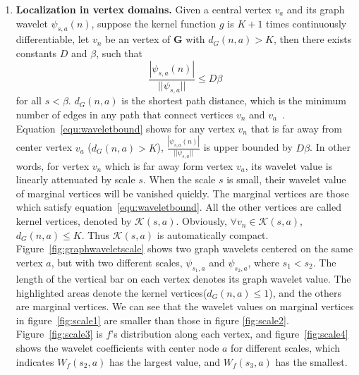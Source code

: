 \documentclass[conference]{IEEEtran}
\begin{document}
\begin{enumerate}
\item \textbf{Localization in vertex domains.} Given a central vertex $v_a$ and its graph wavelet $\psi_{s,a}(n)$, suppose the kernel function $g$ is $K+1$ times continuously differentiable, let $v_n$ be an vertex of $\mathbf{G}$ with $d_G(n,a)>K$, then there exists constants $D$ and $\beta$, such that
\begin{equation}
\label{equ:waveletbound}
\frac{|\psi_{s,a}(n)|}{||\psi_{s,a}||}\leq D \beta
\end{equation} for all $s<\beta$.
$d_G(n,a)$ is the shortest path distance, which is the minimum number of edges in any path that connect vertices $v_n$ and $v_a$~\cite{hammond2011wavelets}. Equation~\ref{equ:waveletbound} shows for any vertex $v_n$ that is far away from center vertex $v_a$ ($d_G(n,a)>K$), $\frac{|\psi_{s,a}(n)|}{||\psi_{s,a}||}$ is upper bounded by $D\beta$. In other words, for vertex $v_n$ which is far away form vertex $v_a$, its wavelet value is linearly attenuated by scale $s$.  When the scale $s$ is small, their wavelet value of marginal vertices will be vanished quickly. The marginal vertices are those which satisfy equation~\ref{equ:waveletbound}. All the other vertices are called kernel vertices, denoted by $\mathcal{K}(s,a)$. Obviously,   $\forall v_n \in \mathcal{K}(s,a)$,  $d_G(n,a)\le K$. Thus $\mathcal{K}(s,a)$ is automatically compact.
Figure~\ref{fig:graphwaveletscale} shows two graph wavelets centered on the same vertex $a$, but with two different scales, $\psi_{s_1,a}$ and $\psi_{s_2, a}$, where $s_1<s_2$. The length of the vertical bar on each vertex denotes its graph wavelet value. The highlighted areas denote the kernel vertices($d_G(n,a)\le 1$), and the others are marginal vertices. We can see that the wavelet values  on marginal vertices in figure~\ref{fig:scale1} are smaller than those in figure \ref{fig:scale2}. Figure~\ref{fig:scale3} is $f$'s distribution along each vertex, and figure~\ref{fig:scale4} shows the wavelet coefficients with center node $a$ for different scales, which indicates $W_f(s_2,a)$ has the largest value, and $W_f(s_3,a)$ has the smallest.


\end{enumerate}
\end{document}
